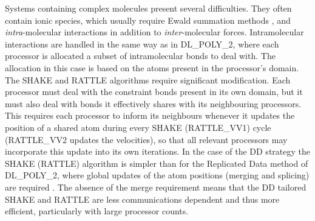 Systems containing complex molecules present several difficulties.
They often contain ionic species, which usually require Ewald
summation methods \cite{allen-89a,smith-92b},
and {\em intra}-molecular interactions in addition to
{\em inter}-molecular forces.  Intramolecular interactions are
handled in the same way as in DL\_POLY\_2, where each processor
is allocated a subset of intramolecular bonds to deal with.  The
allocation in this case is based on the atoms present in the
processor's domain.  The SHAKE and
RATTLE algorithms \cite{ryckaert-77a,andersen-83a}
require significant modification.  Each processor must deal with
the constraint bonds present in its own domain, but it must also
deal with bonds it effectively shares with its neighbouring
processors.  This requires each processor to inform its neighbours
whenever it updates the position of a shared atom during every
SHAKE (RATTLE\_VV1) cycle (RATTLE\_VV2 updates the velocities),
so that all relevant processors may incorporate this update into
its own iterations.  In the case of the DD strategy the SHAKE
(RATTLE) algorithm is simpler than for the Replicated Data method
of DL\_POLY\_2, where global updates of the atom positions
(merging and splicing) are required \cite{smith-93b}.  The
absence of the merge requirement means that the DD tailored
SHAKE and RATTLE are less communications dependent and thus more
efficient, particularly with large processor counts.

